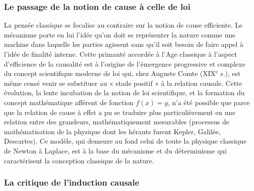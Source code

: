 \subsubsection{Le passage de la notion de cause à celle de loi}

La pensée classique se focalise au
contraire sur la notion de cause efficiente.
Le mécanisme porte en lui l’idée qu’on
doit se représenter la nature comme une
machine dans laquelle les parties agissent
sans qu'il soit besoin de faire appel à
l'idée de finalité interne. Cette primauté
accordée à l’Age classique à l’aspect d’efficience de la causalité est à l’origine de
l'émergence progressive et complexe du
concept scientifique moderne de loi qui,
chez Auguste Comte ({\footnotesize XIX}$^\text{e}$ s.), est même
censé venir se substituer au « stade positif » à la relation causale. Cette évolution,
la lente incubation de la notion de loi
scientifique, et la formation du concept
mathématique afférent de fonction
$f(x) = y$, n’a été possible que parce que la
relation de cause à effet a pu se traduire
plus particulièrement en une relation
entre des grandeurs, mathématiquement
mesurables (processus de mathématisation de la physique dont les hérauts furent
Kepler, Galilée, Descartes). Ce modèle,
qui demeure au fond celui de toute la
physique classique de Newton à Laplace,
est à la base du mécanisme et du déterminisme qui caractérisent la conception classique de la nature.

\subsubsection{La critique de l’induction causale}

